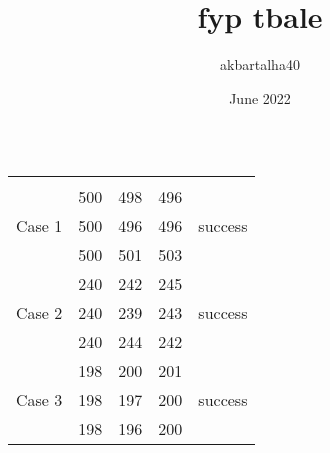 \documentclass{article}
\title{fyp tbale}
\author{akbartalha40 }
\date{June 2022}
\begin{document}
\begin{table}[h]
 \caption{}
    \label{tab:my_label}
\setlength{\arrayrulewidth}{0.5mm}
\setlength{\tabcolsep}{1pt}    
\begin{tabular}{ | m{1.5cm} | m{2.5cm} | m{2.85cm}  m{2.3cm} | m{1.5cm} |   } 
  \hline
 & &   &  &   \\ 
 \hline
 &  &   &  \hspace{0.25cm} &     \\ 
 \hline
      & 500  & \hspace{0.65cm} 498  &\hspace{0.45cm} 496  & \\ 
 
  Case 1    & 500  &\hspace{0.65cm} 496  &\hspace{0.45cm} 496  & success  \\ 
     
      & 500 &\hspace{0.65cm} 501  &\hspace{0.45cm} 503 &   \\ 
   \hline
   
      & 240   &\hspace{0.65cm} 242 &\hspace{0.45cm} 245  & \\ 

   Case 2   & 240  &\hspace{0.65cm} 239 &\hspace{0.45cm} 243  & success  \\ 
   
      & 240   &\hspace{0.65cm} 244 &\hspace{0.45cm} 242  &   \\ 
      \hline
      
     & 198  &\hspace{0.65cm} 200  &\hspace{0.45cm} 201 & \\ 
  
  Case 3     & 198 &\hspace{0.65cm} 197 &\hspace{0.45cm} 200  & success  \\ 
     
      & 198 &\hspace{0.65cm} 196 &\hspace{0.45cm} 200 &   \\ 
      \hline
      

\end{tabular}
\end{table}
\end{document}
